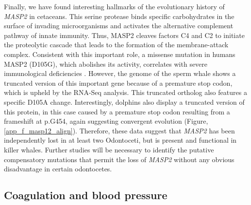 Finally, we have found interesting hallmarks of the evolutionary history of \textit{MASP2} in cetaceans.
This serine protease binds specific carbohydrates in the surface of invading microorganisms and activates the alternative complement pathway of innate immunity.
Thus, MASP2 cleaves factors C4 and C2 to initiate the proteolytic cascade that leads to the formation of the membrane-attack complex.
Consistent with this important role, a missense mutation in humans MASP2 (D105G), which abolishes its activity, correlates with severe immunological deficiencies \cite{Stengaard-Pedersen2003}.
However, the genome of the sperm whale shows a truncated version of this important gene because of a premature stop codon, which is upheld by the RNA-Seq analysis.
This truncated ortholog also features a specific D105A change.
Interestingly, dolphins also display a truncated version of this protein, in this case caused by a premature stop codon resulting from a frameshift at {p.G454}, again suggesting convergent evolution (Figure, \ref{app_f_masp12_align}).
Therefore, these data suggest that \textit{MASP2} has been independently lost in at least two Odontoceti, but is present and functional in killer whales.
Further studies will be necessary to identify the putative compensatory mutations that permit the loss of \textit{MASP2} without any obvious disadvantage in certain odontocetes. 

\subsection{Coagulation and blood pressure} \label{ss_sperm_whale_results_blood}

